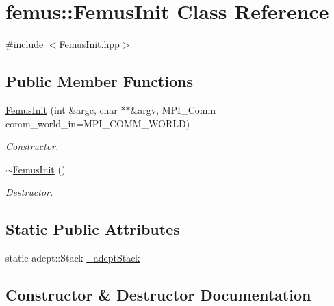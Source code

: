 \hypertarget{classfemus_1_1_femus_init}{}\section{femus\+:\+:Femus\+Init Class Reference}
\label{classfemus_1_1_femus_init}


{\ttfamily \#include $<$Femus\+Init.\+hpp$>$}

\subsection*{Public Member Functions}
\begin{DoxyCompactItemize}
\item 
\mbox{\hyperlink{classfemus_1_1_femus_init_a31469e71e3cc5be638a8ed8b9df2218b}{Femus\+Init}} (int \&argc, char $\ast$$\ast$\&argv, M\+P\+I\+\_\+\+Comm comm\+\_\+world\+\_\+in=M\+P\+I\+\_\+\+C\+O\+M\+M\+\_\+\+W\+O\+R\+LD)
\begin{DoxyCompactList}\small\item\em Constructor. \end{DoxyCompactList}\item 
\mbox{\hyperlink{classfemus_1_1_femus_init_a0d8bd96e2534e355eaf3621d012292ba}{$\sim$\+Femus\+Init}} ()
\begin{DoxyCompactList}\small\item\em Destructor. \end{DoxyCompactList}\end{DoxyCompactItemize}
\subsection*{Static Public Attributes}
\begin{DoxyCompactItemize}
\item 
static adept\+::\+Stack \mbox{\hyperlink{classfemus_1_1_femus_init_ab48c1191eb7ebb370a323d3ec4f713c9}{\+\_\+adept\+Stack}}
\end{DoxyCompactItemize}


\subsection{Constructor \& Destructor Documentation}
\mbox{\label{classfemus_1_1_femus_init_a31469e71e3cc5be638a8ed8b9df2218b}} 
